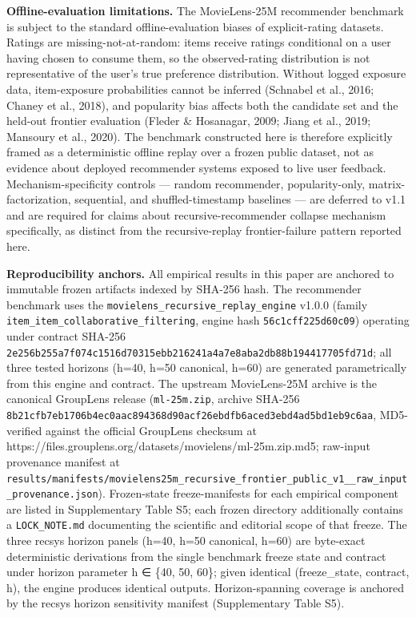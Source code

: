 \documentclass[
  11pt,
]{article}
\begin{document}
\textbf{Offline-evaluation limitations.} The MovieLens-25M recommender
benchmark is subject to the standard offline-evaluation biases of
explicit-rating datasets. Ratings are missing-not-at-random: items
receive ratings conditional on a user having chosen to consume them, so
the observed-rating distribution is not representative of the user's
true preference distribution. Without logged exposure data,
item-exposure probabilities cannot be inferred (Schnabel et al., 2016;
Chaney et al., 2018), and popularity bias affects both the candidate set
and the held-out frontier evaluation (Fleder \& Hosanagar, 2009; Jiang
et al., 2019; Mansoury et al., 2020). The benchmark constructed here is
therefore explicitly framed as a deterministic offline replay over a
frozen public dataset, not as evidence about deployed recommender
systems exposed to live user feedback. Mechanism-specificity controls
--- random recommender, popularity-only, matrix-factorization,
sequential, and shuffled-timestamp baselines --- are deferred to v1.1
and are required for claims about recursive-recommender collapse
mechanism specifically, as distinct from the recursive-replay
frontier-failure pattern reported here.

\textbf{Reproducibility anchors.} All empirical results in this paper
are anchored to immutable frozen artifacts indexed by SHA-256 hash. The
recommender benchmark uses the
\texttt{movielens\_recursive\_replay\_engine} v1.0.0 (family
\texttt{item\_item\_collaborative\_filtering}, engine hash
\texttt{56c1cff225d60c09}) operating under contract SHA-256
\texttt{2e256b255a7f074c1516d70315ebb216241a4a7e8aba2db88b194417705fd71d};
all three tested horizons (h=40, h=50 canonical, h=60) are generated
parametrically from this engine and contract. The upstream MovieLens-25M
archive is the canonical GroupLens release (\texttt{ml-25m.zip}, archive
SHA-256
\texttt{8b21cfb7eb1706b4ec0aac894368d90acf26ebdfb6aced3ebd4ad5bd1eb9c6aa},
MD5-verified against the official GroupLens checksum at
https://files.grouplens.org/datasets/movielens/ml-25m.zip.md5; raw-input
provenance manifest at
\texttt{results/manifests/movielens25m\_recursive\_frontier\_public\_v1\_\_raw\_input\_provenance.json}).
Frozen-state freeze-manifests for each empirical component are listed in
Supplementary Table S5; each frozen directory additionally contains a
\texttt{LOCK\_NOTE.md} documenting the scientific and editorial scope of
that freeze. The three recsys horizon panels (h=40, h=50 canonical,
h=60) are byte-exact deterministic derivations from the single benchmark
freeze state and contract under horizon parameter h ∈ \{40, 50, 60\};
given identical (freeze\_state, contract, h), the engine produces
identical outputs. Horizon-spanning coverage is anchored by the recsys
horizon sensitivity manifest (Supplementary Table S5).
\end{document}
